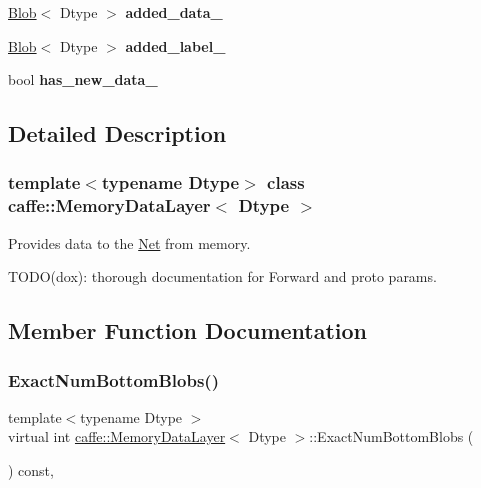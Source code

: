 \begin{DoxyCompactItemize}
\mbox{\hyperlink{classcaffe_1_1_blob}{Blob}}$<$ Dtype $>$ {\bfseries added\+\_\+data\+\_\+}
\item 
\mbox{\label{classcaffe_1_1_memory_data_layer_ab946de44a602183cf28ff1f2770b0aed}} 
\mbox{\hyperlink{classcaffe_1_1_blob}{Blob}}$<$ Dtype $>$ {\bfseries added\+\_\+label\+\_\+}
\item 
\mbox{\label{classcaffe_1_1_memory_data_layer_a853f5cc1091152cac0ef6cbf57ac253a}} 
bool {\bfseries has\+\_\+new\+\_\+data\+\_\+}
\end{DoxyCompactItemize}


\subsection{Detailed Description}
\subsubsection*{template$<$typename Dtype$>$\newline
class caffe\+::\+Memory\+Data\+Layer$<$ Dtype $>$}

Provides data to the \mbox{\hyperlink{classcaffe_1_1_net}{Net}} from memory. 

T\+O\+D\+O(dox)\+: thorough documentation for Forward and proto params. 

\subsection{Member Function Documentation}
\mbox{\label{classcaffe_1_1_memory_data_layer_a05a867526de7e0c6ec4851a97f52a47b}} 
\subsubsection{\texorpdfstring{Exact\+Num\+Bottom\+Blobs()}{ExactNumBottomBlobs()}\hspace{0.1cm}{\footnotesize\ttfamily [1/2]}}
{\footnotesize\ttfamily template$<$typename Dtype $>$ \\
virtual int \mbox{\hyperlink{classcaffe_1_1_memory_data_layer}{caffe\+::\+Memory\+Data\+Layer}}$<$ Dtype $>$\+::Exact\+Num\+Bottom\+Blobs (\begin{DoxyParamCaption}{ }\end{DoxyParamCaption}) const\hspace{0.3cm}{\ttfamily [inline]}, {\ttfamily [virtual]}}



